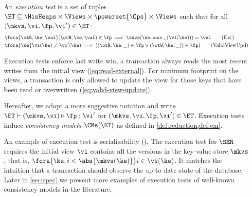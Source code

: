 \begin{definition}
\label{def:execution.test}
An \emph{execution test} is a set of tuples $\ET \subseteq \HisHeaps \times \Views \times \powerset{\Ops} \times \Views$ 
such that for all $(\mkvs, \vi, \fp, \vi') \in \ET$:
\begin{align}
    & \fora{\otR, \ke, \val} (\otR, \ke, \val) \in \fp \implies \mkvs(\ke, \max{}_{<}(\vi(\ke))) = \val \tag{Ext} \label{eq:read-external} \\
    & \fora{\ke} \vi(\ke) \neq \vi'(\ke) \implies
    ( (\otR, \ke, \_) \in \fp \vee (\otW, \ke, \_)) \in \fp) \tag{ValidViewUpd} \label{eq:valid-view-update}
\end{align}
\end{definition}

Execution tests enforce last write win,
\ie a transaction always reads the most recent writes from the initial view (\cref{eq:read-external}).
For minimum footprint on the views, a transaction is only allowed to update the view for those keys that have been read or overwritten (\cref{eq:valid-view-update}).


Hereafter, we adopt a more suggestive notation and write $\ET \vdash (\mkvs, \vi) \triangleright \fp: \vi'$ 
for $(\mkvs, \vi, \fp, \vi') \in \ET$.
Execution tests induce \emph{consistency models} \( \CMs(\ET) \) as defined in \cref{def:reduction,def:cm}.

An example of execution test is serialisability (\SER).
The execution test for \( \SER \) requires the initial view  \( \vi \) contains all the versions in the key-value store \( \mkvs \), that is, \( \fora{\ke, i < \abs{\mkvs(\ke)} } i \in \vi(\ke)\).
It matches the intuition that a transaction should observe the up-to-date state of the database.
Later in \cref{sec:spec} we present more examples of execution tests of well-known consistency models in the literature. 


